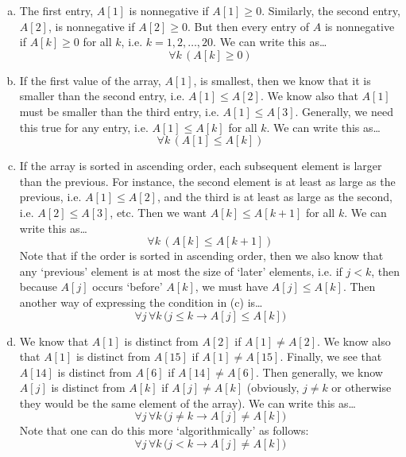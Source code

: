 \documentclass[11pt,letterpaper]{article}
\begin{document}
\sol 
\begin{enumerate}[(a)]
\item The first entry, $A[1]$ is nonnegative if $A[1] \geq 0$. Similarly, the second entry, $A[2]$, is nonnegative if $A[2] \geq 0$. But then every entry of $A$ is nonnegative if $A[k] \geq 0$ for all $k$, i.e. $k= 1, 2, \ldots, 20$. We can write this as\dots
	\[
	\forall k\, (A[k] \geq 0)
	\] \pspace

\item If the first value of the array, $A[1]$, is smallest, then we know that it is smaller than the second entry, i.e. $A[1] \leq A[2]$. We know also that $A[1]$ must be smaller than the third entry, i.e. $A[1] \leq A[3]$. Generally, we need this true for any entry, i.e. $A[1] \leq A[k]$ for all $k$. We can write this as\dots
	\[
	\forall k\, (A[1] \leq A[k])
	\] \pspace

\item If the array is sorted in ascending order, each subsequent element is larger than the previous. For instance, the second element is at least as large as the previous, i.e. $A[1] \leq A[2]$, and the third is at least as large as the second, i.e. $A[2] \leq A[3]$, etc. Then we want $A[k] \leq A[k + 1]$ for all $k$. We can write this as\dots
	\[
	\forall k\, (A[k] \leq A[k+1])
	\]
Note that if the order is sorted in ascending order, then we also know that any `previous' element is at most the size of `later' elements, i.e. if $j < k$, then because $A[j]$ occurs `before' $A[k]$, we must have $A[j] \leq A[k]$. Then another way of expressing the condition in (c) is\dots
	\[
	\forall j\, \forall k\, \big( j \leq k \to A[j] \leq A[k] \big)
	\] \pspace

\item We know that $A[1]$ is distinct from $A[2]$ if $A[1] \neq A[2]$. We know also that $A[1]$ is distinct from $A[15]$ if $A[1] \neq A[15]$. Finally, we see that $A[14]$ is distinct from $A[6]$ if $A[14] \neq A[6]$. Then generally, we know $A[j]$ is distinct from $A[k]$ if $A[j] \neq A[k]$ (obviously, $j \neq k$ or otherwise they would be the same element of the array). We can write this as\dots
	\[
	\forall j\, \forall k\, \big( j \neq k \to A[j] \neq A[k] \big)
	\]
Note that one can do this more `algorithmically' as follows:
	\[
	\forall j\, \forall k\, \big( j < k \to A[j] \neq A[k] \big)
	\]
\end{enumerate}



\newpage
\end{document}

